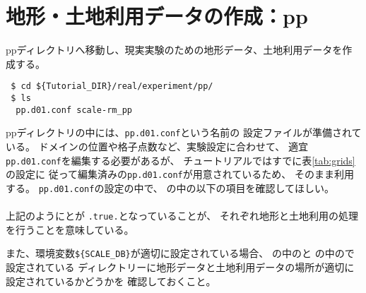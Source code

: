 \section{地形・土地利用データの作成：pp} \label{sec:tutrial_real_pp}

ppディレクトリへ移動し、現実実験のための地形データ、土地利用データを作成する。
\begin{verbatim}
 $ cd ${Tutorial_DIR}/real/experiment/pp/
 $ ls 
  pp.d01.conf scale-rm_pp
\end{verbatim}
ppディレクトリの中には、\verb|pp.d01.conf|という名前の
設定ファイルが準備されている。
ドメインの位置や格子点数など、実験設定に合わせて、
適宜\verb|pp.d01.conf|を編集する必要があるが、
チュートリアルではすでに表\ref{tab:grids}の設定に
従って編集済みの\verb|pp.d01.conf|が用意されているため、
そのまま利用する。
\verb|pp.d01.conf|の設定の中で、
の中の以下の項目を確認してほしい。\\

\\

\noindent 上記のようにとが
\verb|.true.|となっていることが、
それぞれ地形と土地利用の処理を行うことを意味している。

また、環境変数\verb|${SCALE_DB}|が適切に設定されている場合、
の中のと
の中ので設定されている
ディレクトリーに地形データと土地利用データの場所が適切に設定されているかどうかを
確認しておくこと。\\



